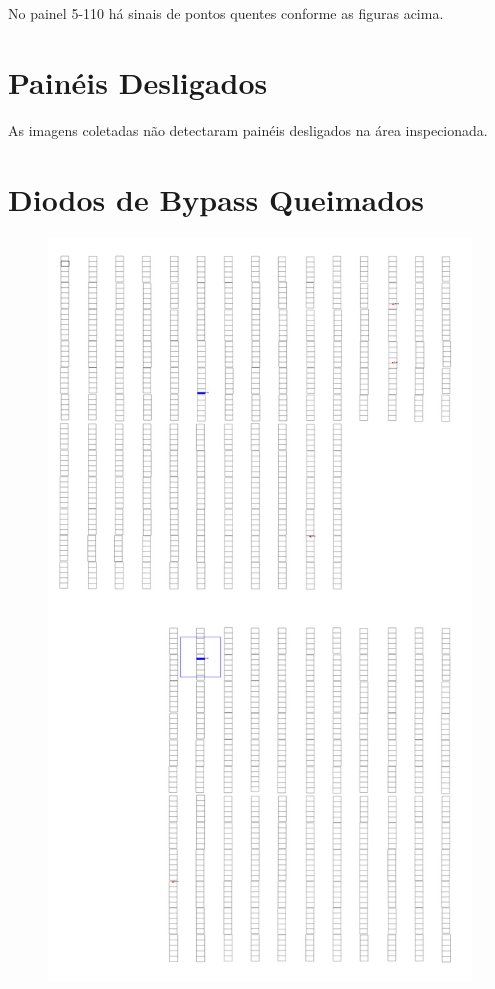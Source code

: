 \documentclass[dvipsnames]{article}%
\begin{document}
%
\FloatBarrier%
No painel 5{-}110 há sinais de pontos quentes conforme as figuras acima.\newline%
%
\newpage%
\section{Painéis Desligados}%
As imagens coletadas não detectaram painéis desligados na área inspecionada.\newline%
%
\newpage%
\section{Diodos de Bypass Queimados}%


\begin{figure}[h!]%
\begin{minipage}{0.31\linewidth}%
\centering%
\centering%
\includegraphics[width=\linewidth]{report_images/faultydiodes_6-68_map.jpg}%

\end{minipage}
\end{figure}
\end{document}
